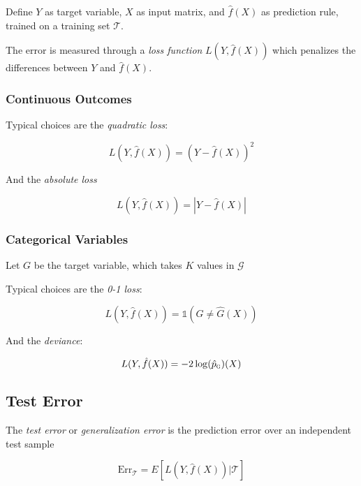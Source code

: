 \documentclass[twoside,twocolumn,10pt]{revtex4-1}
\begin{document}
	Define $Y$ as target variable, $X$ as input matrix, and $\hat{f}(X)$ as prediction rule, trained on a training set $\mathcal{T}$.
	
	The error is measured through a \textit{loss function} $L(Y, \hat{f}(X))$ which penalizes the differences between $Y$ and $\hat{f}(X)$.
	
	\subsubsection{Continuous Outcomes}
	
	
	Typical choices are the \textit{quadratic loss}:
	
	\begin{equation*}
	L(Y,\hat{f}(X)) = (Y - \hat{f}(X))^2
	\end{equation*}		
	
	And the \textit{absolute loss}
	
	\begin{equation*}
	L(Y,\hat{f}(X)) = |Y - \hat{f}(X)|
	\end{equation*}
	
	\subsubsection{Categorical Variables}
	
	Let $G$ be the target variable, which takes $K$ values in $\mathcal{G}$
	
	Typical choices are the \textit{0-1 loss}:
	
	\begin{equation*}
	L(Y,\hat{f}(X)) = \mathbb{1}(G \neq \hat{G}(X))
	\end{equation*}
	
	And the \textit{deviance}:
	
	\begin{equation*}
	L(Y,\hat{f}(X)) = -2 \log(\hat{p}_\textsc{g}) (X)
	\end{equation*}
	
	\subsection{Test Error}
	
	The \textit{test error} or \textit{generalization error} is the prediction error over an independent test sample
	
	\begin{equation*}
	\text{Err}_\mathcal{T} = E[L(Y,\hat{f}(X))| \mathcal{T} ]
	\end{equation*}
	
\end{document}
